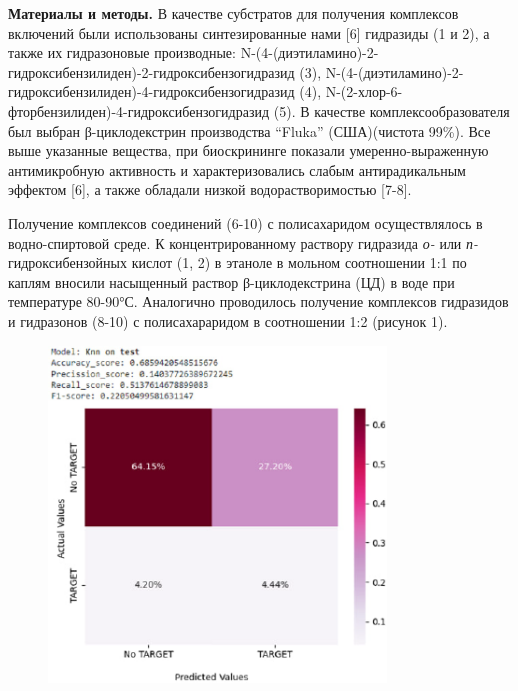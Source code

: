 {\bfseries Материалы и методы.} В качестве субстратов для получения
комплексов включений были использованы синтезированные нами {[}6{]}
гидразиды (1 и 2), а также их гидразоновые производные:
N-(4-(диэтиламино)-2-гидроксибензилиден)-2-гидроксибензогидразид (3),
N-(4-(диэтиламино)-2-гидроксибензилиден)-4-гидроксибензогидразид (4),
N-(2-хлор-6-фторбензилиден)-4-гидроксибензогидразид (5). В качестве
комплексообразователя был выбран β-циклодекстрин производства ``Fluka''
(США)(чистота 99\%). Все выше указанные вещества, при биоскрининге
показали умеренно-выраженную антимикробную активность и
характеризовались слабым антирадикальным эффектом {[}6{]}, а также
обладали низкой водорастворимостью {[}7-8{]}.

Получение комплексов соединений (6-10) с полисахаридом осуществлялось в
водно-спиртовой среде. К концентрированному раствору гидразида \emph{о-}
или \emph{п-}гидроксибензойных кислот (1, 2) в этаноле в мольном
соотношении 1:1 по каплям вносили насыщенный раствор β-циклодекстрина
(ЦД) в воде при температуре 80-90°С. Аналогично проводилось получение
комплексов гидразидов и гидразонов (8-10) с полисахараридом в
соотношении 1:2 (рисунок 1).

\begin{figure}[H]
	\centering
	\includegraphics[width=0.8\textwidth]{assets/42}
	\caption*{}
\end{figure}

